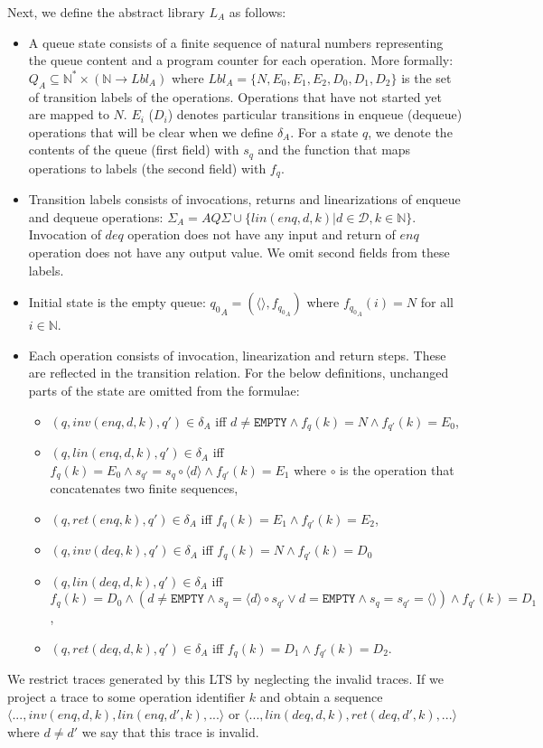 Next, we define the abstract library $L_A$ as follows:
\begin{itemize}
\item A queue state consists of a finite sequence of natural numbers representing the queue content and a program counter for each operation. More formally: $Q_A \subseteq \mathbb{N}^*  \times (\mathbb{N} \rightarrow Lbl_A)$ where $Lbl_A = \{N, E_0, E_1, E_2, D_0, D_1, D_2 \}$ is the set of transition labels of the operations. Operations that have not started yet are mapped to $N$. $E_i$ ($D_i$) denotes particular transitions in enqueue (dequeue) operations that will be clear when we define $\delta_A$. For a state $q$, we denote the contents of the queue (first field) with $s_q$ and the function that maps operations to labels (the second field) with $f_q$.
\item Transition labels consists of invocations, returns and linearizations of enqueue and dequeue operations: $\Sigma_A = AQ\Sigma \cup \{lin(enq,d,k)| d \in \mathcal{D}, k \in \mathbb{N}\}$. Invocation of $deq$ operation does not have any input and return of $enq$ operation does not have any output value. We omit second fields from these labels.
\item Initial state is the empty queue: ${q_0}_A = (\langle \rangle, f_{{q_0}_A})$ where $f_{{q_0}_A}(i) = N$ for all $i \in \mathbb{N}$.
\item Each operation consists of invocation, linearization and return steps. These are reflected in the transition relation. For the below definitions, unchanged parts of the state are omitted from the formulae:
\begin{itemize}
\item $(q, inv(enq,d,k), q') \in \delta_A$ iff $ d \neq \texttt{EMPTY} \wedge f_q(k) = N \wedge f_{q'}(k) = E_0$,
\item $(q,lin(enq,d,k),q') \in \delta_A$ iff $f_q(k) =E_0 \wedge s_{q'} = s_q \circ \langle d \rangle \wedge f_{q'}(k) = E_1$ where $\circ$ is the operation that concatenates two finite sequences,
\item $(q,ret(enq,k),q') \in \delta_A$ iff $f_q(k) = E_1 \wedge f_{q'}(k) = E_2$,
\item $(q, inv(deq,k), q') \in \delta_A$ iff $f_q(k) = N \wedge f_{q'}(k) = D_0$
\item $(q,lin(deq,d,k),q') \in \delta_A$ iff $f_q(k) =D_0 \wedge (d \neq \texttt{EMPTY} \wedge s_q = \langle d \rangle \circ s_{q'} \vee d=\texttt{EMPTY} \wedge s_q = s_{q'} = \langle \rangle )\wedge f_{q'}(k) = D_1$, 
\item $(q,ret(deq,d,k),q') \in \delta_A$ iff $f_q(k) = D_1 \wedge f_{q'}(k) = D_2$.
\end{itemize}

\end{itemize} 
We restrict traces generated by this LTS by neglecting the invalid traces. If we project a trace to some operation identifier $k$ and obtain a sequence $\langle ..., inv(enq,d,k), lin(enq,d',k),...\rangle$ or $\langle ..., lin(deq,d,k), ret(deq,d',k),...\rangle$ where $d \neq d'$ we say that this trace is invalid.

